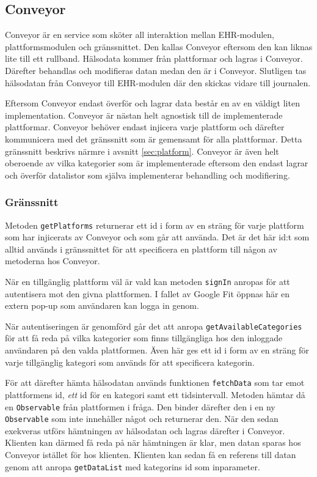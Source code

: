 \documentclass[techdoc/techdoc.tex]{subfiles}
\begin{document}
\subsection{Conveyor}
Conveyor är en service som sköter all interaktion mellan EHR-modulen,
plattformsmodulen och gränssnittet. Den kallas Conveyor eftersom den kan liknas
lite till ett rullband. Hälsodata kommer från plattformar och lagras i
Conveyor. Därefter behandlas och modifieras datan medan den är i Conveyor.
Slutligen tas hälsodatan från Conveyor till EHR-modulen där den skickas vidare
till journalen.

Eftersom Conveyor endast överför och lagrar data består en av en väldigt liten
implementation. Conveyor är nästan helt agnostisk till de implementerade
plattformar. Conveyor behöver endast injicera varje plattform och därefter
kommunicera med det gränssnitt som är gemensamt för alla plattformar. Detta
gränssnitt beskrivs närmre i avsnitt \ref{sec:platform}. Conveyor är även helt
oberoende av vilka kategorier som är implementerade eftersom den endast lagrar
och överför datalistor som själva implementerar behandling och modifiering.

\subsubsection{Gränssnitt}
Metoden \texttt{getPlatforms} returnerar ett id i form av en sträng för varje
plattform som har injicerats av Conveyor och som går att använda. Det är det
här id:t som alltid används i gränssnittet för att specificera en plattform
till någon av metoderna hos Conveyor.

När en tillgänglig plattform väl är vald kan metoden \texttt{signIn} anropas
för att autentisera mot den givna plattformen. I fallet av Google Fit öppnas
här en extern pop-up som användaren kan logga in genom.

När autentiseringen är genomförd går det att anropa
\texttt{getAvailableCategories} för att få reda på vilka kategorier som finns
tillgängliga hos den inloggade användaren på den valda plattformen. Även här
ges ett id i form av en sträng för varje tillgänglig kategori som används för
att specificera kategorin.

För att därefter hämta hälsodatan används funktionen \texttt{fetchData} som tar
emot plattformens id, \emph{ett} id för en kategori samt ett tidsintervall.
Metoden hämtar då en \texttt{Observable} från plattformen i fråga. Den binder
därefter den i en ny \texttt{Observable} som inte innehåller något och
returnerar den. När den sedan exekveras utförs hämtningen av hälsodatan och
lagras därefter i Conveyor. Klienten kan därmed få reda på när hämtningen är
klar, men datan sparas hos Conveyor istället för hos klienten. Klienten kan
sedan få en referens till datan genom att anropa \texttt{getDataList} med
kategorins id som inparameter.
\end{document}

